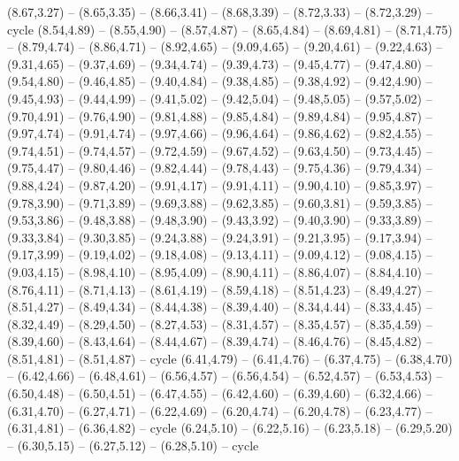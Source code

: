 \expandafter\def\csname geo:gebiet:LKA\endcsname{
  (8.67,3.27) -- (8.65,3.35) -- (8.66,3.41) -- (8.68,3.39) -- (8.72,3.33) -- (8.72,3.29) -- cycle}
\expandafter\def\csname geo:gebiet:CHN\endcsname{
  (8.54,4.89) -- (8.55,4.90) -- (8.57,4.87) -- (8.65,4.84) -- (8.69,4.81) -- (8.71,4.75) -- (8.79,4.74) -- (8.86,4.71) -- (8.92,4.65) -- (9.09,4.65) -- (9.20,4.61) -- (9.22,4.63) -- (9.31,4.65) -- (9.37,4.69) -- (9.34,4.74) -- (9.39,4.73) -- (9.45,4.77) -- (9.47,4.80) -- (9.54,4.80) -- (9.46,4.85) -- (9.40,4.84) -- (9.38,4.85) -- (9.38,4.92) -- (9.42,4.90) -- (9.45,4.93) -- (9.44,4.99) -- (9.41,5.02) -- (9.42,5.04) -- (9.48,5.05) -- (9.57,5.02) -- (9.70,4.91) -- (9.76,4.90) -- (9.81,4.88) -- (9.85,4.84) -- (9.89,4.84) -- (9.95,4.87) -- (9.97,4.74) -- (9.91,4.74) -- (9.97,4.66) -- (9.96,4.64) -- (9.86,4.62) -- (9.82,4.55) -- (9.74,4.51) -- (9.74,4.57) -- (9.72,4.59) -- (9.67,4.52) -- (9.63,4.50) -- (9.73,4.45) -- (9.75,4.47) -- (9.80,4.46) -- (9.82,4.44) -- (9.78,4.43) -- (9.75,4.36) -- (9.79,4.34) -- (9.88,4.24) -- (9.87,4.20) -- (9.91,4.17) -- (9.91,4.11) -- (9.90,4.10) -- (9.85,3.97) -- (9.78,3.90) -- (9.71,3.89) -- (9.69,3.88) -- (9.62,3.85) -- (9.60,3.81) -- (9.59,3.85) -- (9.53,3.86) -- (9.48,3.88) -- (9.48,3.90) -- (9.43,3.92) -- (9.40,3.90) -- (9.33,3.89) -- (9.33,3.84) -- (9.30,3.85) -- (9.24,3.88) -- (9.24,3.91) -- (9.21,3.95) -- (9.17,3.94) -- (9.17,3.99) -- (9.19,4.02) -- (9.18,4.08) -- (9.13,4.11) -- (9.09,4.12) -- (9.08,4.15) -- (9.03,4.15) -- (8.98,4.10) -- (8.95,4.09) -- (8.90,4.11) -- (8.86,4.07) -- (8.84,4.10) -- (8.76,4.11) -- (8.71,4.13) -- (8.61,4.19) -- (8.59,4.18) -- (8.51,4.23) -- (8.49,4.27) -- (8.51,4.27) -- (8.49,4.34) -- (8.44,4.38) -- (8.39,4.40) -- (8.34,4.44) -- (8.33,4.45) -- (8.32,4.49) -- (8.29,4.50) -- (8.27,4.53) -- (8.31,4.57) -- (8.35,4.57) -- (8.35,4.59) -- (8.39,4.60) -- (8.43,4.64) -- (8.44,4.67) -- (8.39,4.74) -- (8.46,4.76) -- (8.45,4.82) -- (8.51,4.81) -- (8.51,4.87) -- cycle}
\expandafter\def\csname geo:gebiet:TWN\endcsname{
  }
\expandafter\def\csname geo:gebiet:ITA\endcsname{
  (6.41,4.79) -- (6.41,4.76) -- (6.37,4.75) -- (6.38,4.70) -- (6.42,4.66) -- (6.48,4.61) -- (6.56,4.57) -- (6.56,4.54) -- (6.52,4.57) -- (6.53,4.53) -- (6.50,4.48) -- (6.50,4.51) -- (6.47,4.55) -- (6.42,4.60) -- (6.39,4.60) -- (6.32,4.66) -- (6.31,4.70) -- (6.27,4.71) -- (6.22,4.69) -- (6.20,4.74) -- (6.20,4.78) -- (6.23,4.77) -- (6.31,4.81) -- (6.36,4.82) -- cycle}
\expandafter\def\csname geo:gebiet:DNK\endcsname{
  (6.24,5.10) -- (6.22,5.16) -- (6.23,5.18) -- (6.29,5.20) -- (6.30,5.15) -- (6.27,5.12) -- (6.28,5.10) -- cycle}
